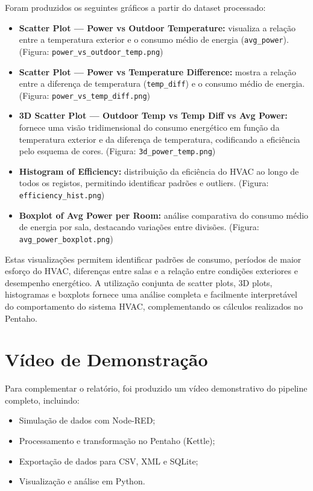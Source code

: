 \documentclass[a4paper, 12pt]{article} %
\begin{document}
Foram produzidos os seguintes gráficos a partir do dataset processado:

\begin{itemize}
	\item \textbf{Scatter Plot — Power vs Outdoor Temperature:} visualiza a relação entre a temperatura exterior e o consumo médio de energia (\texttt{avg\_power}). (Figura: \texttt{power\_vs\_outdoor\_temp.png})
	\item \textbf{Scatter Plot — Power vs Temperature Difference:} mostra a relação entre a diferença de temperatura (\texttt{temp\_diff}) e o consumo médio de energia. (Figura: \texttt{power\_vs\_temp\_diff.png})
	\item \textbf{3D Scatter Plot — Outdoor Temp vs Temp Diff vs Avg Power:} fornece uma visão tridimensional do consumo energético em função da temperatura exterior e da diferença de temperatura, codificando a eficiência pelo esquema de cores. (Figura: \texttt{3d\_power\_temp.png})
	\item \textbf{Histogram of Efficiency:} distribuição da eficiência do HVAC ao longo de todos os registos, permitindo identificar padrões e outliers. (Figura: \texttt{efficiency\_hist.png})
	\item \textbf{Boxplot of Avg Power per Room:} análise comparativa do consumo médio de energia por sala, destacando variações entre divisões. (Figura: \texttt{avg\_power\_boxplot.png})
\end{itemize}

Estas visualizações permitem identificar padrões de consumo, períodos de maior esforço do HVAC, diferenças entre salas e a relação entre condições exteriores e desempenho energético.  
A utilização conjunta de scatter plots, 3D plots, histogramas e boxplots fornece uma análise completa e facilmente interpretável do comportamento do sistema HVAC, complementando os cálculos realizados no Pentaho.


\newpage
\section{Vídeo de Demonstração}

Para complementar o relatório, foi produzido um vídeo demonstrativo do pipeline completo, incluindo:

\begin{itemize}
	\item Simulação de dados com Node-RED;
	\item Processamento e transformação no Pentaho (Kettle);
	\item Exportação de dados para CSV, XML e SQLite;
	\item Visualização e análise em Python.
\end{itemize}
\end{document}
